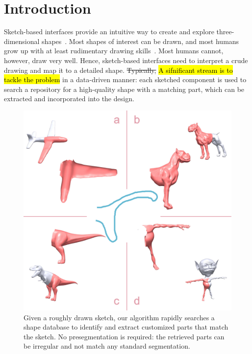 \section{Introduction}

Sketch-based interfaces provide an intuitive way to create and explore three-dimensional shapes~\cite{sketchbasedmodelingsurveycg2009}. Most shapes of interest can be drawn, and most humans grow up with at least rudimentary drawing skills~\cite{DeckerChildren1988}. Most humans cannot, however, draw very well. Hence, sketch-based interfaces need to interpret a crude drawing and map it to a detailed shape. \st{Typically, } \hl{A sifnificant stream is to tackle the problem }in a data-driven manner: each sketched component is used to search a repository for a high-quality shape with a matching part, which can be extracted and incorporated into the design.

\begin{figure}[h!]
\centering
\includegraphics[width=0.9\linewidth]{./Material/TeaserSGP.pdf}
\caption{Given a roughly drawn sketch, our algorithm rapidly searches a shape database to identify and extract customized parts that match the sketch. No presegmentation is required: the retrieved parts can be irregular and not match any standard segmentation.}
\label{fig:HeadPic}
\end{figure}


